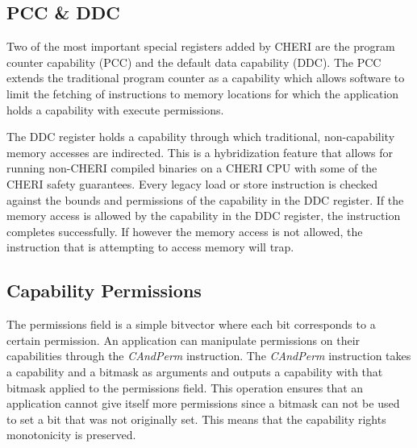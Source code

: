 \subsection{PCC \& DDC}
Two of the most important special registers added by CHERI are the program counter capability (PCC) and the default data capability (DDC). The PCC extends the traditional program counter as a capability which allows software to limit the fetching of instructions to memory locations for which the application holds a capability with execute permissions.

The DDC register holds a capability through which traditional, non-capability memory accesses are indirected. This is a hybridization feature that allows for running non-CHERI compiled binaries on a CHERI CPU with some of the CHERI safety guarantees. Every legacy load or store instruction is checked against the bounds and permissions of the capability in the DDC register. If the memory access is allowed by the capability in the DDC register, the instruction completes successfully. If however the memory access is not allowed, the instruction that is attempting to access memory will trap.

\subsection{Capability Permissions}
\label{sec:capperms}
The permissions field is a simple bitvector where each bit corresponds to a certain permission. An application can manipulate permissions on their capabilities through the \textit{CAndPerm} instruction. The \textit{CAndPerm} instruction takes a capability and a bitmask as arguments and outputs a capability with that bitmask applied to the permissions field. This operation ensures that an application cannot give itself more permissions since a bitmask can not be used to set a bit that was not originally set. This means that the capability rights monotonicity is preserved.

